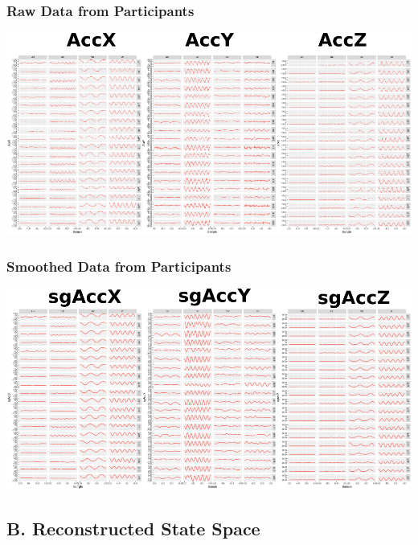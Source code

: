 \documentclass{beamer}
\begin{document}
\begin{frame}
\frametitle{Raw Data from Participants}


\begin{adjustwidth}{-3em}{-3em}
\includegraphics[width=1.2\textwidth]{HS01}
\end{adjustwidth}

\end{frame}



\begin{frame}
\frametitle{Smoothed Data from Participants}


\begin{adjustwidth}{-3em}{-3em}
\includegraphics[width=1.2\textwidth]{HsgS01}
\end{adjustwidth}

\end{frame}




\subsection{B. Reconstructed State Space }
\end{document}

